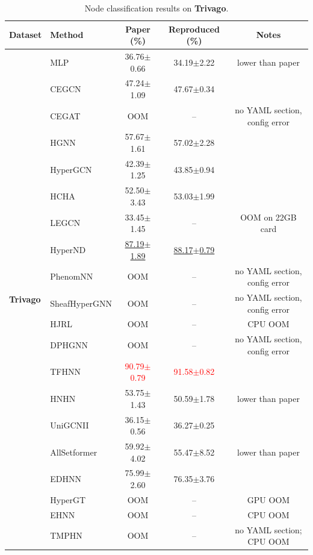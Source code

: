 \documentclass[11pt,a4paper]{article}
\begin{document}
\begin{table}[H]
	\centering\small
	\begin{tabular}{llccc}
		\toprule
		Dataset & Method & Paper (\%) & Reproduced (\%) & Notes \\
		\midrule
		\multirow{20}{*}{\textbf{Trivago}} & MLP               & 36.76$\pm$0.66   & 34.19$\pm$2.22   & lower than paper \\
		 & CEGCN             & 47.24$\pm$1.09   & 47.67$\pm$0.34   &  \\
		 & CEGAT             & OOM              & --               & no YAML section, config error \\
		 & HGNN              & 57.67$\pm$1.61   & 57.02$\pm$2.28   &  \\
		 & HyperGCN          & 42.39$\pm$1.25   & 43.85$\pm$0.94   &  \\
		 & HCHA              & 52.50$\pm$3.43   & 53.03$\pm$1.99   &  \\
		 & LEGCN             & 33.45$\pm$1.45   & --               & OOM on 22GB card \\
		 & HyperND           & \underline{87.19$\pm$1.89}   & \underline{88.17$\pm$0.79}   &  \\
		 & PhenomNN          & OOM              & --               & no YAML section, config error \\
		 & SheafHyperGNN     & OOM              & --               & no YAML section, config error \\
		 & HJRL              & OOM              & --               & CPU OOM \\
		 & DPHGNN            & OOM              & --               & no YAML section, config error \\
		 & TFHNN             & \textcolor{red}{90.79$\pm$0.79}   & \textcolor{red}{91.58$\pm$0.82}   &  \\
		 & HNHN              & 53.75$\pm$1.43   & 50.59$\pm$1.78   & lower than paper \\
		 & UniGCNII          & 36.15$\pm$0.56   & 36.27$\pm$0.25   &  \\
		 & AllSetformer      & 59.92$\pm$4.02   & 55.47$\pm$8.52   & lower than paper \\
		 & EDHNN             & 75.99$\pm$2.60   & 76.35$\pm$3.76   &  \\
		 & HyperGT           & OOM              & --               & GPU OOM \\
		 & EHNN              & OOM              & --               & CPU OOM \\
		 & TMPHN             & OOM              & --               & no YAML section; CPU OOM \\
		\bottomrule
	\end{tabular}
	\caption{Node classification results on \textbf{Trivago}.}
\end{table}
\end{document}
